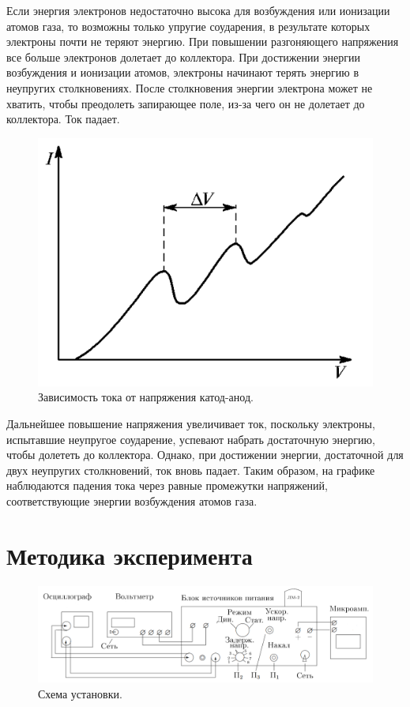 \documentclass[12pt,a4paper]{article}
\begin{document}
	Если энергия электронов недостаточно высока для возбуждения или ионизации атомов газа, то возможны только упругие соударения, в результате которых электроны почти не теряют энергию. При повышении разгоняющего напряжения все больше электронов долетает до коллектора. При достижении энергии возбуждения и ионизации атомов, электроны начинают терять энергию в неупругих столкновениях. После столкновения энергии электрона может не хватить, чтобы преодолеть запирающее поле, из-за чего он не долетает до коллектора. Ток падает.
	\begin{figure}
		\includegraphics[width=\linewidth]{res/iv.png}
		\caption{Зависимость тока от напряжения катод-анод.}
		\label{fig:iv}
		\vspace{0pt}
	\end{figure}
	
	Дальнейшее повышение напряжения увеличивает ток, поскольку электроны, испытавшие неупругое соударение, успевают набрать достаточную энергию, чтобы долететь до коллектора. Однако, при достижении энергии, достаточной для двух неупругих столкновений, ток вновь падает. Таким образом, на графике наблюдаются падения тока через равные промежутки напряжений, соответствующие энергии возбуждения атомов газа.
	
	\newpage
	\section*{Методика эксперимента}
	
	\begin{figure}[H]
		\centering
		\includegraphics[width=0.9\linewidth]{res/block_scheme.png}
		\caption{Схема установки.}
		\label{fig:block_scheme}
	\end{figure}
	
\end{document}
